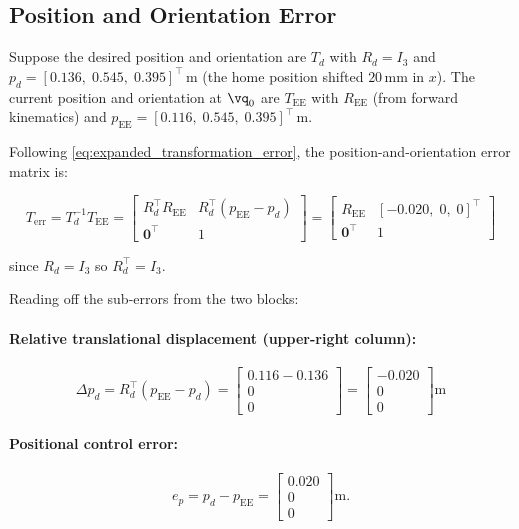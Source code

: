 \subsection{Position and Orientation Error}

Suppose the desired position and orientation are \(T_d\) with \(R_d=I_3\)
and $p_d=[0.136,\;0.545,\;0.395]^\top\,\mathrm{m}$
(the home position shifted $20\,\mathrm{mm}$ in $x$).
The current position and orientation at $\vq_0$ are \(T_{\mathrm{EE}}\) with \(R_{\mathrm{EE}}\) (from forward kinematics)
and $p_{\mathrm{EE}}=[0.116,\;0.545,\;0.395]^\top\,\mathrm{m}$.

Following \cref{eq:expanded_transformation_error}, the position-and-orientation error matrix is:

\begin{equation}
T_{\mathrm{err}} = T_d^{-1}T_{\mathrm{EE}} =
\begin{bmatrix}
R_d^\top R_{\mathrm{EE}} &
R_d^\top(p_{\mathrm{EE}} - p_d) \\
\mathbf{0}^\top & 1
\end{bmatrix}
=
\begin{bmatrix}
R_{\mathrm{EE}} & [-0.020,\;0,\;0]^\top \\
\mathbf{0}^\top & 1
\end{bmatrix}
\end{equation}

since \(R_d=I_3\) so \(R_d^\top=I_3\).

Reading off the sub-errors from the two blocks:

\paragraph{Relative translational displacement (upper-right column):}
\begin{equation}
\label{eq:panda_relative_displacement}
\Delta p_d = R_d^\top(p_{\mathrm{EE}} - p_d) =
\begin{bmatrix}
0.116 - 0.136 \\ 0 \\ 0
\end{bmatrix}
=
\begin{bmatrix}
-0.020 \\ 0 \\ 0
\end{bmatrix}
\mathrm{m}
\end{equation}

\paragraph{Positional control error:}
\begin{equation}
\label{eq:panda_error}
e_p = p_d-p_{\mathrm{EE}} =
\begin{bmatrix}
0.020 \\ 0 \\ 0
\end{bmatrix}
\mathrm{m}.
\end{equation}

